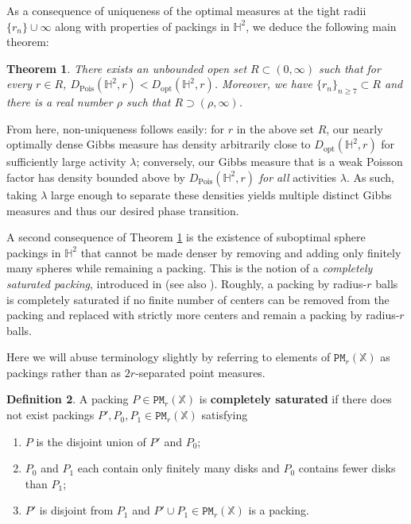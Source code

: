 \documentclass[11pt]{amsart}
\newtheorem{theorem}{Theorem}
\theoremstyle{definition}
\newtheorem{definition}[theorem]{Definition}
\theoremstyle{remark}
\renewcommand{\H}{\mathbb{H}}
\newcommand{\bX}{\mathbb{X}}
\newcommand{\cP}{\mathtt{PM}}
\newcommand{\opt}{\operatorname{opt}}
\newcommand{\Pois}{\operatorname{Pois}}
\newcommand{\Dopt}{D_{\opt}}
\begin{document}
As a consequence of uniqueness of the optimal measures at the tight radii $\{r_n\} \cup \infty$ along with properties of packings in $\H^2$, we  deduce the following main theorem:
\begin{theorem}
    \label{T:poissongap}
    There exists an unbounded open set $R \subset (0,\infty)$ such that for every $r \in R$, $D_{\Pois}(\H^2,r)<\Dopt(\H^2,r)$. Moreover, we have $\{r_n\}_{n \geq 7} \subset R$ and there is a real number $\rho$ such that $R \supset (\rho,\infty)$.
\end{theorem}

From here, non-uniqueness follows easily: for $r$ in the above set $R$, our nearly optimally dense Gibbs measure has density arbitrarily close to $\Dopt(\H^2,r)$  for sufficiently large activity $\lambda$; conversely, our Gibbs measure that is a weak Poisson factor has density bounded above by $D_{\Pois}(\H^2,r)$ \emph{for all} activities $\lambda$.  As such, taking $\lambda$ large enough to separate these densities yields multiple distinct Gibbs measures and thus our desired phase transition.  




A second consequence of Theorem \ref{T:poissongap} is the existence of suboptimal sphere packings in $\H^2$ that cannot be made denser by removing and adding  only finitely many spheres while remaining a packing.  This is the notion of a \textit{completely saturated packing}, introduced in \cite{MR1604938} (see also \cite{bowen2003existence}).  Roughly, a packing by radius-$r$ balls is completely saturated if no finite number of centers can be removed from the packing and replaced with strictly more centers and remain a packing by radius-$r$ balls.

Here we will abuse terminology slightly by referring to elements of $\cP_r(\bX)$ as packings rather than as $2r$-separated point measures. 
\begin{definition}
A packing $P \in \cP_r(\bX)$ is {\bf completely saturated} if there does not exist  packings $P',P_0,P_1 \in \cP_r(\bX)$ satisfying
\begin{enumerate}
    \item $P$ is the disjoint union of $P'$ and $P_0$;
    \item $P_0$ and $P_1$ each contain only finitely many disks and $P_0$ contains fewer disks than $P_1$;
    \item $P'$ is disjoint from $P_1$ and $P' \cup P_1 \in \cP_r(\bX)$ is a packing.
\end{enumerate}
\end{definition}
\end{document}
